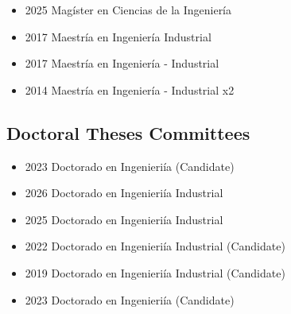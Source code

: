 {\begin{itemize}
    \item 2025 Mag\'ister en Ciencias de la Ingenier\'ia
\end{itemize}
}


{\begin{itemize}
    \item 2017 Maestr\'ia en Ingenier\'ia Industrial
\end{itemize}
}

{\begin{itemize}
    \item 2017 Maestr\'ia en Ingenier\'ia - Industrial
\end{itemize}
}

{\begin{itemize}
    \item 2014 Maestr\'ia en Ingenier\'ia - Industrial x2
\end{itemize}
}

\clearpage

\subsection{Doctoral Theses Committees}

{\begin{itemize}
    \item 2023 Doctorado en Ingenieri\'ia (Candidate)
\end{itemize}
}

{\begin{itemize}
    \item 2026 Doctorado en Ingenieri\'ia Industrial
    \item 2025 Doctorado en Ingenieri\'ia Industrial
    \item 2022 Doctorado en Ingenieri\'ia Industrial (Candidate)
    \item 2019 Doctorado en Ingenieri\'ia Industrial (Candidate)
\end{itemize}
}

{\begin{itemize}
    \item 2023 Doctorado en Ingenieri\'ia (Candidate)
\end{itemize}
}

